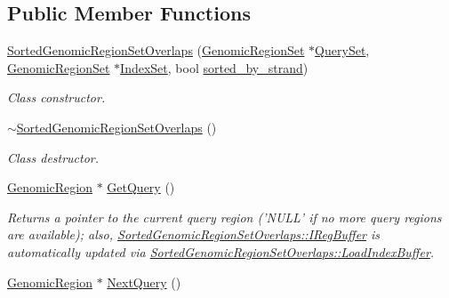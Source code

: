 \subsection*{Public Member Functions}
\begin{CompactItemize}
\item 
\hyperlink{classSortedGenomicRegionSetOverlaps_0213f6ea908db759f63cea80db4909aa}{SortedGenomicRegionSetOverlaps} (\hyperlink{classGenomicRegionSet}{GenomicRegionSet} $\ast$\hyperlink{classGenomicRegionSetOverlaps_e513304379055f6d379bc5907733dbe2}{QuerySet}, \hyperlink{classGenomicRegionSet}{GenomicRegionSet} $\ast$\hyperlink{classGenomicRegionSetOverlaps_c587bf854c827381493735b473622e03}{IndexSet}, bool \hyperlink{classSortedGenomicRegionSetOverlaps_f08c449faa6ba7be7c6ed9c07f4226e3}{sorted\_\-by\_\-strand})
\begin{CompactList}\small\item\em Class constructor. \item\end{CompactList}\item 
\hypertarget{classSortedGenomicRegionSetOverlaps_1ac0a70899fce3684da0b7e915a13d1e}{
\hyperlink{classSortedGenomicRegionSetOverlaps_1ac0a70899fce3684da0b7e915a13d1e}{$\sim$SortedGenomicRegionSetOverlaps} ()}
\label{classSortedGenomicRegionSetOverlaps_1ac0a70899fce3684da0b7e915a13d1e}

\begin{CompactList}\small\item\em Class destructor. \item\end{CompactList}\item 
\hypertarget{classSortedGenomicRegionSetOverlaps_3b187db0a12f876a9347b4a1641670a0}{
\hyperlink{classGenomicRegion}{GenomicRegion} $\ast$ \hyperlink{classSortedGenomicRegionSetOverlaps_3b187db0a12f876a9347b4a1641670a0}{GetQuery} ()}
\label{classSortedGenomicRegionSetOverlaps_3b187db0a12f876a9347b4a1641670a0}

\begin{CompactList}\small\item\em Returns a pointer to the current query region ('NULL' if no more query regions are available); also, \hyperlink{classSortedGenomicRegionSetOverlaps_19fa18e6abd9f045786698fff48a445f}{SortedGenomicRegionSetOverlaps::IRegBuffer} is automatically updated via \hyperlink{classSortedGenomicRegionSetOverlaps_d894d118c61c3cd11be8b37b8f185120}{SortedGenomicRegionSetOverlaps::LoadIndexBuffer}. \item\end{CompactList}\item 
\hypertarget{classSortedGenomicRegionSetOverlaps_127edf3e9d8fb2ebf189af00e6893e96}{
\hyperlink{classGenomicRegion}{GenomicRegion} $\ast$ \hyperlink{classSortedGenomicRegionSetOverlaps_127edf3e9d8fb2ebf189af00e6893e96}{NextQuery} ()}
\label{classSortedGenomicRegionSetOverlaps_127edf3e9d8fb2ebf189af00e6893e96}


\end{CompactItemize}
